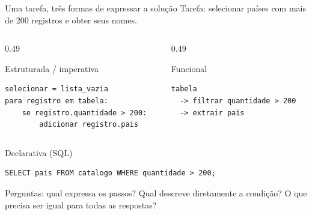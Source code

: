 \documentclass[aspectratio=169,10pt]{beamer}
\begin{document}
\begin{frame}[fragile]{Uma tarefa, três formas de expressar a solução}
  \small Tarefa: selecionar países com mais de 200 registros e obter seus nomes.
  \begin{columns}[T,onlytextwidth]
    \begin{column}{0.49\textwidth}
      \begin{block}{Estruturada / imperativa}
\begin{lstlisting}
selecionar = lista_vazia
para registro em tabela:
    se registro.quantidade > 200:
        adicionar registro.pais
\end{lstlisting}
      \end{block}
    \end{column}
    \begin{column}{0.49\textwidth}
      \begin{exampleblock}{Funcional}
\begin{lstlisting}
tabela
  -> filtrar quantidade > 200
  -> extrair pais
\end{lstlisting}
      \end{exampleblock}
    \end{column}
  \end{columns}
  \begin{block}{Declarativa (SQL)}
\begin{lstlisting}
SELECT pais FROM catalogo WHERE quantidade > 200;
\end{lstlisting}
  \end{block}
  \small Perguntas: qual expressa os passos? Qual descreve diretamente a condição? O que precisa ser igual para todas as respostas?
\end{frame}
\end{document}
